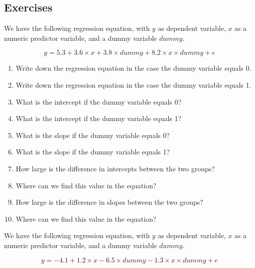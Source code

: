 \documentclass[]{book}\usepackage[]{graphicx}\usepackage[]{color}
\begin{document}
\subsection{Exercises}




We have the following regression equation, with $y$ as dependent variable, $x$ as a numeric predictor variable, and a dummy variable $dummy$.

\begin{equation} 
y = 5.3 + 3.6  \times x + 3.8  \times dummy + 8.2  \times x  \times dummy + e \nonumber
\end{equation}
\begin{enumerate}




\item
Write down the regression equation in the case the dummy variable equals 0.

\item Write down the regression equation in the case the dummy variable equals 1.
\item What is the intercept if the dummy variable equals 0?
\item What is the intercept if the dummy variable equals 1?
\item What is the slope if the dummy variable equals 0?
\item What is the slope if the dummy variable equals 1?
\item How large is the difference in intercepts between the two groups?
\item Where can we find this value in the equation?
\item How large is the difference in slopes between the two groups?
\item Where can we find this value in the equation?

\end{enumerate}



We have the following regression equation, with $y$ as dependent variable, $x$ as a numeric predictor variable, and a dummy variable $dummy$.

\begin{equation} 
y = - 4.1 + 1.2  \times x - 6.5  \times dummy - 1.3 \times x \times dummy + e \nonumber
\end{equation}
\end{document}
